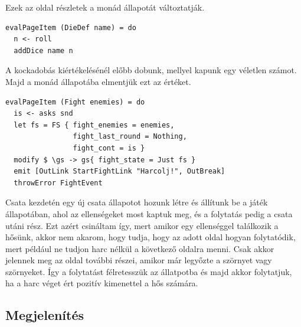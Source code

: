 \documentclass[12pt,a4paper,oneside]{report}
\begin{document}
  Ezek az oldal részletek a monád állapotát változtatják.
  \begin{verbatim}
evalPageItem (DieDef name) = do
  n <- roll
  addDice name n
  \end{verbatim}
  A kockadobás kiértékelésénél előbb dobunk, mellyel kapunk egy
  véletlen számot. Majd a monád állapotába elmentjük ezt az értéket.
  \begin{verbatim}
evalPageItem (Fight enemies) = do
  is <- asks snd
  let fs = FS { fight_enemies = enemies,
                fight_last_round = Nothing,
                fight_cont = is }
  modify $ \gs -> gs{ fight_state = Just fs }
  emit [OutLink StartFightLink "Harcolj!", OutBreak]
  throwError FightEvent
  \end{verbatim}
  Csata kezdetén egy új csata állapotot hozunk létre és állítunk be a
  játék állapotában, ahol az ellenségeket most kaptuk meg, és a
  folytatás pedig a csata utáni rész. Ezt azért csináltam így, mert
  amikor egy ellenséggel találkozik a hősünk, akkor nem akarom,
  hogy tudja, hogy az adott oldal hogyan folytatódik, mert például ne
  tudjon harc nélkül a következő oldalra menni. Csak akkor jelennek
  meg az oldal további részei, amikor már legyőzte a szörnyet vagy
  szörnyeket. Így a folytatást félretesszük az állatpotba és majd
  akkor folytatjuk, ha a harc véget ért pozitív kimenettel a hős számára.
  
  \subsection{Megjelenítés}
\end{document}
